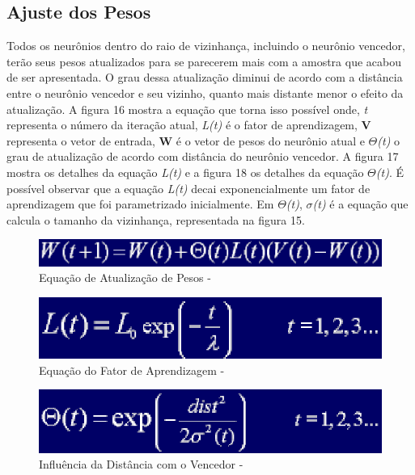 \subsection{Ajuste dos Pesos}
Todos os neurônios dentro do raio de vizinhança, incluindo o neurônio vencedor, terão seus pesos atualizados para se parecerem mais com a amostra que acabou de ser apresentada. O grau dessa atualização diminui de acordo com a distância entre o neurônio vencedor e seu vizinho, quanto mais distante menor o efeito da atualização. A figura 16 mostra a equação que torna isso possível onde, \textit{t} representa o número da iteração atual, \textit{L(t)} é o fator de aprendizagem, \textbf{V} representa o vetor de entrada, \textbf{W} é o vetor de pesos do neurônio atual e \textit{$\Theta$(t)} o grau de atualização de acordo com distância do neurônio vencedor. A figura 17 mostra os detalhes da equação \textit{L(t)} e a figura 18 os detalhes da equação \textit{$\Theta$(t)}. É possível observar que a equação \textit{L(t)} decai exponencialmente um fator de aprendizagem que foi parametrizado inicialmente. Em \textit{$\Theta$(t)}, \textit{\textit{$\sigma$(t)}} é a equação que calcula o tamanho da vizinhança, representada na figura 15.


\begin{figure}[!h]
\centering
\includegraphics[keepaspectratio=true,scale=0.60]
{figuras/weights.eps}
\caption{Equação de Atualização de Pesos - }
\label{data_titatic}
\end{figure}



\begin{figure}[!h]
\centering
\includegraphics[keepaspectratio=true,scale=0.60]
{figuras/aprendizagem.eps}
\caption{Equação do Fator de Aprendizagem - }
\label{data_titatic}
\end{figure}

\begin{figure}[!h]
\centering
\includegraphics[keepaspectratio=true,scale=0.60]
{figuras/influencia.eps}
\caption{Influência da Distância com o Vencedor - }
\label{data_titatic}
\end{figure}

